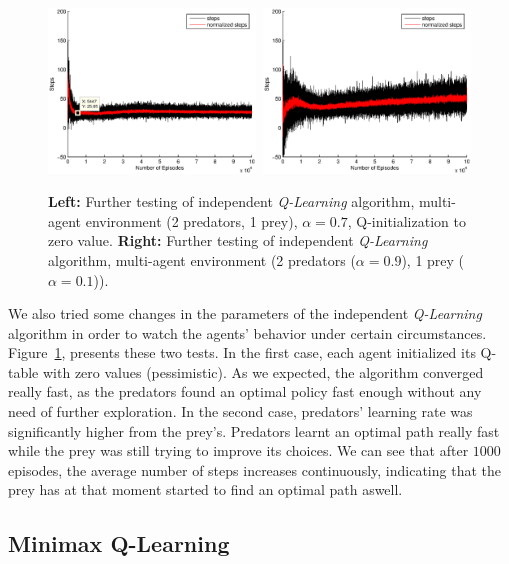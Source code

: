 \documentclass[a4paper,11pt]{article}
\begin{document}
\begin{figure}[ht!]
  \centering
    \includegraphics[width=0.49\textwidth]{figures/q2init.eps}\	
    \includegraphics[width=0.49\textwidth]{figures/q2learnfast.eps}
    \caption{\textbf{Left:} Further testing of independent \textit{Q-Learning} algorithm, multi-agent environment (2 predators, 1 prey), $\alpha = 0.7$, Q-initialization to zero value. \textbf{Right:} Further testing of independent \textit{Q-Learning} algorithm, multi-agent environment (2 predators ($\alpha = 0.9$), 1 prey ($\alpha = 0.1$)).}
    \label{qtest}
\end{figure}

We also tried some changes in the parameters of the independent \textit{Q-Learning} algorithm in order to watch the agents' behavior under certain circumstances. Figure~\ref{qtest}, presents these two tests. In the first case, each agent initialized its Q-table with zero values (pessimistic). As we expected, the algorithm converged really fast, as the predators found an optimal policy fast enough without any need of further exploration. In the second case, predators' learning rate was significantly higher from the prey's. Predators learnt an optimal path really fast while the prey was still trying to improve its choices. We can see that after $1000$ episodes, the average number of steps increases continuously, indicating that the prey has at that moment started to find an optimal path aswell.


\subsection{Minimax Q-Learning}
\end{document}
